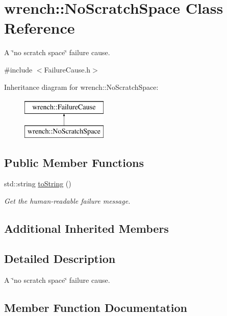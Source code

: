 \hypertarget{classwrench_1_1_no_scratch_space}{}\section{wrench\+:\+:No\+Scratch\+Space Class Reference}
\label{classwrench_1_1_no_scratch_space}


A \char`\"{}no scratch space\char`\"{} failure cause.  




{\ttfamily \#include $<$Failure\+Cause.\+h$>$}

Inheritance diagram for wrench\+:\+:No\+Scratch\+Space\+:\begin{figure}[H]
\begin{center}
\leavevmode
\includegraphics[height=2.000000cm]{classwrench_1_1_no_scratch_space}
\end{center}
\end{figure}
\subsection*{Public Member Functions}
\begin{DoxyCompactItemize}
\item 
std\+::string \hyperlink{classwrench_1_1_no_scratch_space_add628f91104786a99a410ec07abac54c}{to\+String} ()
\begin{DoxyCompactList}\small\item\em Get the human-\/readable failure message. \end{DoxyCompactList}\end{DoxyCompactItemize}
\subsection*{Additional Inherited Members}


\subsection{Detailed Description}
A \char`\"{}no scratch space\char`\"{} failure cause. 

\subsection{Member Function Documentation}
\mbox{\label{classwrench_1_1_no_scratch_space_add628f91104786a99a410ec07abac54c}} 
